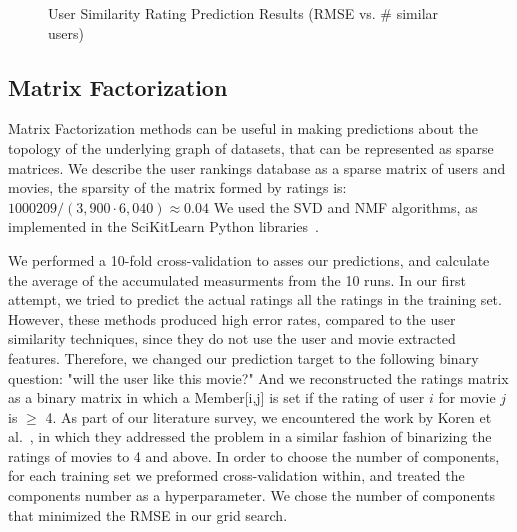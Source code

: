 \begin{figure}
\center
{}
\caption{User Similarity Rating Prediction Results (RMSE vs. \# similar users)}
\label{fig:user_similarity}  
\end{figure}


\subsection{Matrix Factorization}

Matrix Factorization methods can be useful in making predictions about the topology of the underlying graph of datasets, that can be represented as sparse matrices.
We describe the user rankings database as a sparse matrix of users and movies, the sparsity of the matrix formed by ratings is: $1000209/(3,900 \cdot 6,040)\approx0.04$
We used the SVD and NMF algorithms, as implemented in the SciKitLearn Python libraries~\cite{pedregosa2011scikit}.

We performed a 10-fold cross-validation to asses our predictions, and calculate the average of the accumulated measurments from the 10 runs. 
In our first attempt, we tried to predict the actual ratings all the ratings in the training set. However, these methods produced high error rates, compared to the user similarity techniques, since they do not use the user and movie extracted features.
Therefore, we changed our prediction target to the following binary question: "will the user like this movie?"
And we reconstructed the ratings matrix as a binary matrix in which a Member[i,j] is set if the rating of user $i$ for movie $j$ is $\geq$ 4. As part of our literature survey, we encountered the work by Koren et al.~\cite{koren2009matrix}, in which they addressed the problem in a similar fashion of binarizing the ratings of movies to 4 and above. In order to choose the number of components, for each training set we preformed cross-validation within, and treated the components number as a hyperparameter. We chose the number of components that minimized the RMSE in our grid search.


